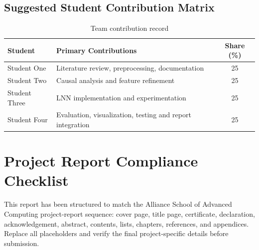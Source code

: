 \documentclass[12pt,a4paper,oneside]{report}
\begin{document}
\section{Suggested Student Contribution Matrix}
\begin{table}[H]
\centering
\caption{Team contribution record}
\begin{tabularx}{\textwidth}{|l|X|c|}\hline
\textbf{Student} & \textbf{Primary Contributions} & \textbf{Share (\%)}\\\hline
Student One & Literature review, preprocessing, documentation & 25\\\hline
Student Two & Causal analysis and feature refinement & 25\\\hline
Student Three & LNN implementation and experimentation & 25\\\hline
Student Four & Evaluation, visualization, testing and report integration & 25\\\hline
\end{tabularx}
\end{table}

\chapter{Project Report Compliance Checklist}
This report has been structured to match the Alliance School of Advanced Computing project-report sequence: cover page, title page, certificate, declaration, acknowledgement, abstract, contents, lists, chapters, references, and appendices. Replace all placeholders and verify the final project-specific details before submission.
\end{document}
